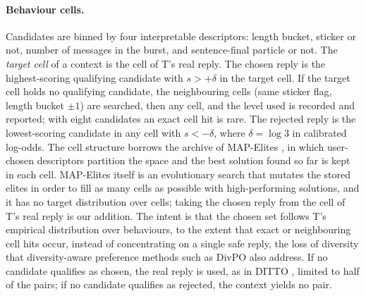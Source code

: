 \paragraph{Behaviour cells.}
Candidates are binned by four interpretable descriptors: length bucket, sticker or not, number of messages in the burst, and sentence-final particle or not.
The \emph{target cell} of a context is the cell of T's real reply.
The chosen reply is the highest-scoring qualifying candidate with $s > +\delta$ in the target cell.
If the target cell holds no qualifying candidate, the neighbouring cells (same sticker flag, length bucket $\pm 1$) are searched, then any cell, and the level used is recorded and reported; with eight candidates an exact cell hit is rare.
The rejected reply is the lowest-scoring candidate in any cell with $s < -\delta$, where $\delta = \log 3$ in calibrated log-odds.
The cell structure borrows the archive of MAP-Elites \citep{mouret2015illuminating}, in which user-chosen descriptors partition the space and the best solution found so far is kept in each cell.
MAP-Elites itself is an evolutionary search that mutates the stored elites in order to fill as many cells as possible with high-performing solutions, and it has no target distribution over cells; taking the chosen reply from the cell of T's real reply is our addition.
The intent is that the chosen set follows T's empirical distribution over behaviours, to the extent that exact or neighbouring cell hits occur, instead of concentrating on a single safe reply, the loss of diversity that diversity-aware preference methods such as DivPO \citep{lanchantin2025divpo} also address.
If no candidate qualifies as chosen, the real reply is used, as in DITTO \citep{shaikh2025ditto}, limited to half of the pairs; if no candidate qualifies as rejected, the context yields no pair.


